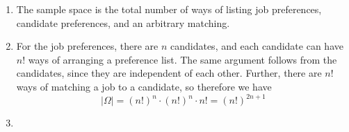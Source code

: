 \documentclass[11pt]{article}
\begin{document}
\begin{Parts}
     \begin{solution}
      \begin{enumerate}
        \item The sample space is the total number of ways of listing job preferences, candidate preferences, and an arbitrary matching. 
        \item For the job preferences, there are $n$ candidates, and each candidate can have $n!$ ways of arranging a preference list. The same argument follows from the candidates, since they are independent of each other. Further, there are $n!$ ways of matching a job to a candidate, so therefore we have 
        \[ |\Omega| = (n!)^n \cdot (n!)^n \cdot n! = (n!)^{2n + 1}\]
        \item
      \end{enumerate}
     \end{solution}
\end{Parts}
\end{document}
